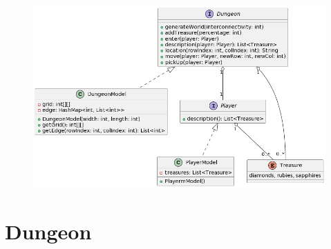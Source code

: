 \documentclass[12pt]{amsart}
\title{}
\author{}
\date{} %
\begin{document}
\begin{figure}[H] %
\centering %
\includegraphics[width=1\textwidth]{uml.png} %
\end{figure}

\newpage

\section{Dungeon}
\end{document}
